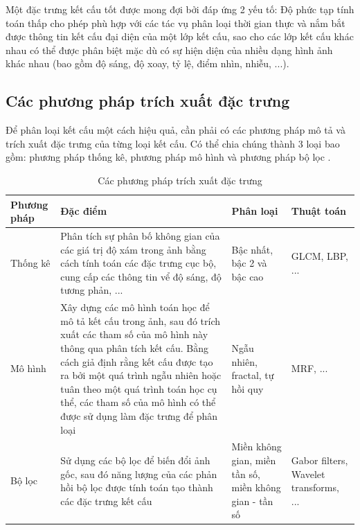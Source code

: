 Một đặc trưng kết cấu tốt được mong đợi bởi đáp ứng 2 yếu tố: Độ phức tạp tính toán thấp cho phép phù hợp với các tác vụ phân loại thời gian thực và nắm bắt được thông tin kết cấu đại diện của một lớp kết cấu, sao cho các lớp kết cấu khác nhau có thể được phân biệt mặc dù có sự hiện diện của nhiều dạng hình ảnh khác nhau (bao gồm độ sáng, độ xoay, tỷ lệ, điểm nhìn, nhiễu, ...).


\subsection{Các phương pháp trích xuất đặc trưng}
Để phân loại kết cấu một cách hiệu quả, cần phải có các phương pháp mô tả và trích xuất đặc trưng của từng loại kết cấu. Có thể chia chúng thành 3 loại bao gồm: phương pháp thống kê, phương pháp mô hình và phương pháp bộ lọc \cite{analyticOfTexture}.

\begin{table}[h]
    \centering
    \renewcommand{\arraystretch}{1.3} %
    \begin{tabular}{p{3cm} p{7cm} p{3cm} p{2cm}}
        \toprule
        \textbf{Phương pháp} & \textbf{Đặc điểm} & \textbf{Phân loại} & \textbf{Thuật toán} \\
        \midrule
        Thống kê & Phân tích sự phân bố không gian của các giá trị độ xám trong ảnh bằng cách tính toán các đặc trưng cục bộ, cung cấp các thông tin vể độ sáng, độ tương phản, ... & Bậc nhất, bậc 2 và bậc cao& GLCM, LBP, ... \\
        \midrule
        Mô hình & Xây dựng các mô hình toán học để mô tả kết cấu trong ảnh, sau đó trích xuất các tham số của mô hình này thông qua phân tích kết cấu. Bằng cách giả định rằng kết cấu được tạo ra bởi một quá trình ngẫu nhiên hoặc tuân theo một quá trình toán học cụ thể, các tham số của mô hình có thể được sử dụng làm đặc trưng để phân loại & Ngẫu nhiên, fractal, tự hồi quy & MRF, ... \\

                \midrule
        Bộ lọc & Sử dụng các bộ lọc để biến đổi ảnh gốc, sau đó năng lượng của các phản hồi bộ lọc được tính toán tạo thành các đặc trưng kết cấu & Miền không gian, miền tần số, miền không gian - tần số & Gabor filters, Wavelet transforms, ... \\
                        \bottomrule

    \end{tabular}
    \caption{Các phương pháp trích xuất đặc trưng}
    \label{tab:texture_analysis}
\end{table}


